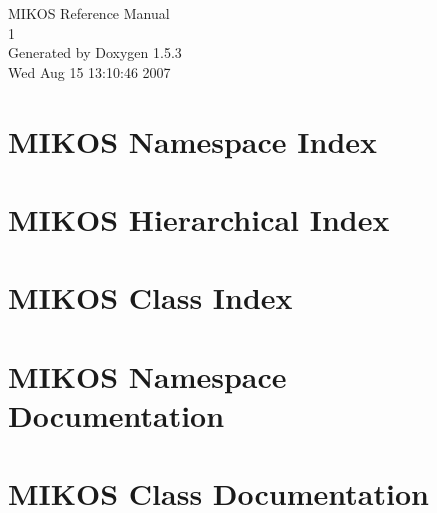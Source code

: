 \documentclass[a4paper]{book}
\begin{document}
\begin{titlepage}
\vspace*{7cm}
\begin{center}
{\Large MIKOS Reference Manual\\[1ex]\large 1 }\\
\vspace*{1cm}
{\large Generated by Doxygen 1.5.3}\\
\vspace*{0.5cm}
{\small Wed Aug 15 13:10:46 2007}\\
\end{center}
\end{titlepage}
\clearemptydoublepage
{}
\tableofcontents
\clearemptydoublepage
{}
\chapter{MIKOS Namespace Index}

\chapter{MIKOS Hierarchical Index}

\chapter{MIKOS Class Index}

\chapter{MIKOS Namespace Documentation}

\chapter{MIKOS Class Documentation}


\printindex
\end{document}
